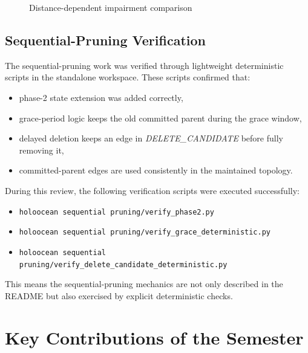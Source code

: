 \documentclass[11pt,a4paper]{article}
\begin{document}
\begin{figure}[htbp]
  \centering
  \caption{Distance-dependent impairment comparison}
  \label{fig:distance_impairment}
\end{figure}

\subsection{Sequential-Pruning Verification}

The sequential-pruning work was verified through lightweight deterministic scripts in the standalone workspace. These scripts confirmed that:
\begin{itemize}
  \item phase-2 state extension was added correctly,
  \item grace-period logic keeps the old committed parent during the grace window,
  \item delayed deletion keeps an edge in \textit{DELETE\_CANDIDATE} before fully removing it,
  \item committed-parent edges are used consistently in the maintained topology.
\end{itemize}

During this review, the following verification scripts were executed successfully:
\begin{itemize}
  \item \texttt{holoocean sequential pruning/verify\_phase2.py}
  \item \texttt{holoocean sequential pruning/verify\_grace\_deterministic.py}
  \item \texttt{holoocean sequential pruning/verify\_delete\_candidate\_deterministic.py}
\end{itemize}

This means the sequential-pruning mechanics are not only described in the README but also exercised by explicit deterministic checks.

\section{Key Contributions of the Semester}
\end{document}
